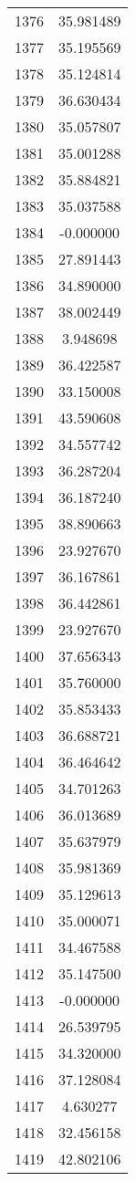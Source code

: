 \documentclass[12pt]{article}
\begin{document}
\begin{longtable}{@{}cc@{}}
1376 & 35.981489 \\
1377 & 35.195569 \\
1378 & 35.124814 \\
1379 & 36.630434 \\
1380 & 35.057807 \\
1381 & 35.001288 \\
1382 & 35.884821 \\
1383 & 35.037588 \\
1384 & -0.000000 \\
1385 & 27.891443 \\
1386 & 34.890000 \\
1387 & 38.002449 \\
1388 & 3.948698 \\
1389 & 36.422587 \\
1390 & 33.150008 \\
1391 & 43.590608 \\
1392 & 34.557742 \\
1393 & 36.287204 \\
1394 & 36.187240 \\
1395 & 38.890663 \\
1396 & 23.927670 \\
1397 & 36.167861 \\
1398 & 36.442861 \\
1399 & 23.927670 \\
1400 & 37.656343 \\
1401 & 35.760000 \\
1402 & 35.853433 \\
1403 & 36.688721 \\
1404 & 36.464642 \\
1405 & 34.701263 \\
1406 & 36.013689 \\
1407 & 35.637979 \\
1408 & 35.981369 \\
1409 & 35.129613 \\
1410 & 35.000071 \\
1411 & 34.467588 \\
1412 & 35.147500 \\
1413 & -0.000000 \\
1414 & 26.539795 \\
1415 & 34.320000 \\
1416 & 37.128084 \\
1417 & 4.630277 \\
1418 & 32.456158 \\
1419 & 42.802106 \\

\end{longtable}
\end{document}

